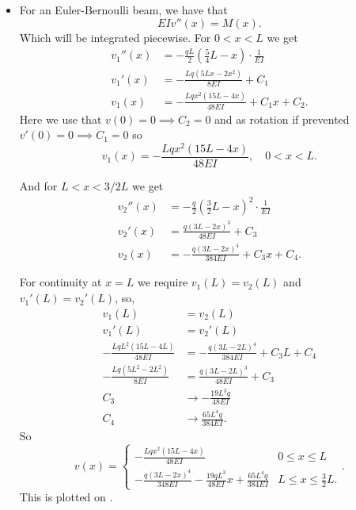 \begin{derivation}
\begin{itemize}
    \item[Q2.3] For an Euler-Bernoulli beam, we have that
      \begin{equation*}
        EI v''(x) = M(x)
      .\end{equation*}
      Which will be integrated piecewise.
      For $0 < x < L$ we get
      \begin{align*}
        v_1''(x) &= - \frac{q L}{2} \left( \frac{5}{4}L - x \right) \cdot \frac{1}{E I} \\
        v_1'(x) &=  -\frac{L q \left(5 L x-2 x^2\right)}{8 EI} + C_1 \\
        v_1(x) &= -\frac{L q x^2 (15 L-4 x)}{48 EI} + C_1 x + C_2
      .\end{align*}
      Here we use that $v(0) = 0 \implies C_2 = 0$ and as rotation if prevented $v'(0) = 0 \implies C_1 = 0$ so
      \begin{equation*}
        v_1(x) = - \frac{L q x^2 \left( 15 L - 4 x \right)}{48 EI}, \quad 0 < x < L
      .\end{equation*}
      
      And for $L < x < 3 / 2 L$ we get
      \begin{align*}
        v_2''(x) &= - \frac{q}{2} \left( \frac{3}{2} L - x \right)^2 \cdot \frac{1}{EI}\\
        v_2'(x) &= \frac{q (3 L-2 x)^3}{48 EI} + C_3 \\
        v_2(x) &= -\frac{q (3 L-2 x)^4}{384 EI} + C_3 x + C_4
      .\end{align*}
      
      For continuity at $x = L$ we require $v_1(L) = v_2(L)$ and $v_1'(L) = v_2'(L)$, so,
      \begin{align*}
        v_1(L) &= v_2(L) \\
        v_1'(L) &= v_2'(L) \\
        - \frac{L q L^2 \left( 15 L - 4 L \right)}{48 EI} &= - \frac{q \left( 3 L - 2 L \right)^{4}}{384 EI} + C_3 L + C_4 \\
        - \frac{L q \left( 5 L^2 - 2 L^2 \right)}{8 EI} &= \frac{q \left( 3 L - 2 L \right)^3}{48 EI} + C_3 \\
        C_3 &\to -\frac{19 L^3 q}{48 EI} \\
        C_4 &\to \frac{65 L^4 q}{384 EI}.
    \end{align*}
    So
    \begin{equation*}
      v(x) = \begin{cases}
        - \frac{L q x^2 (15 L - 4x)}{48EI} & 0 \leq x \leq L\\
      - \frac{q (3L - 2x)^{4}}{348 EI} - \frac{19 q L^3}{48EI} x + \frac{65 L^{4} q }{384EI} & L \leq x \leq \frac{3}{2}L
      .\end{cases}
    .\end{equation*}
    This is plotted on .


\end{itemize}
\end{derivation}
